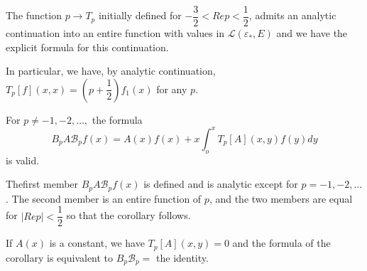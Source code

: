 \begin{theorem*}
  The function $p \to T_p$ initially defined for $- \dfrac{3}{2} < Rep
  < \dfrac{1}{2}$, admits an analytic continuation into an entire
  function with values in $\mathscr{L} (\varepsilon_*, E)$ and we have
  the explicit formula for this continuation. 
\end{theorem*}

In particular, we have, by analytic continuation, $T_p [f] (x, x) = (p
+ \dfrac{1}{2}) f _1 (x)$ for any $p$. 

\begin{coro*}
  For $p \neq - 1, - 2, \ldots,$ the formula
  $$
  B_p A \mathscr{B}_p f (x) = A(x) f(x) + x \int^x_o T_p [A] (x, y) f (y) dy
  $$
  is valid.
\end{coro*}

The\pageoriginale first member $B_p A \mathscr{B}_p f (x)$ is defined and is
analytic except for $p = - 1, -2, \ldots$. The second member is an
entire function of $p$, and the two members are equal for $|Rep| <
\dfrac{1}{2}$ so that the corollary follows. 

\begin{remark*}
  If $A(x)$ is a constant, we have $T_p[A] (x, y) = 0$ and the formula
  of the corollary is equivalent to $B_p \mathscr{B}_p = $ the
  identity. 
\end{remark*}
